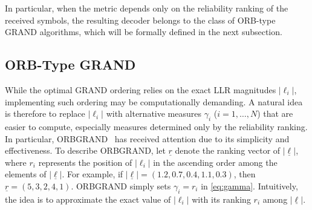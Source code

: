 \documentclass[letterpaper,draftclsnofoot,onecolumn]{IEEEtran}
\begin{document}
In particular, when the metric depends only on the reliability ranking of the received symbols, the resulting decoder belongs to the class of ORB-type GRAND algorithms, which will be formally defined in the next subsection.

\subsection{ORB-Type GRAND}\label{SubSec:ORBTYPE}

While the optimal GRAND ordering relies on the exact LLR magnitudes $|\ell_i|$, implementing such ordering may be computationally demanding. A natural idea is therefore to replace $|\ell_i|$ with alternative measures $\gamma_i$ ($i=1,\ldots,N$) that are easier to compute, especially measures determined only by the reliability ranking.
In particular, ORBGRAND~\cite{duffy2022ORBGRAND} has received attention due to its simplicity and effectiveness. To describe ORBGRAND, let $\underline{r}$ denote the ranking vector of $|\underline{\ell}|$, where $r_i$ represents the position of $|\ell_i|$ in the ascending order among the elements of $|\underline{\ell}|$. For example, if $|\underline{\ell}| = (1.2, 0.7, 0.4, 1.1, 0.3)$, then $\underline{r} = (5, 3, 2, 4, 1)$. ORBGRAND simply sets $\gamma_i = r_i$ in \eqref{eq:gamma}. Intuitively, the idea is to approximate the exact value of $|\ell_i|$ with its ranking $r_i$ among $|\underline{\ell}|$.
\end{document}
